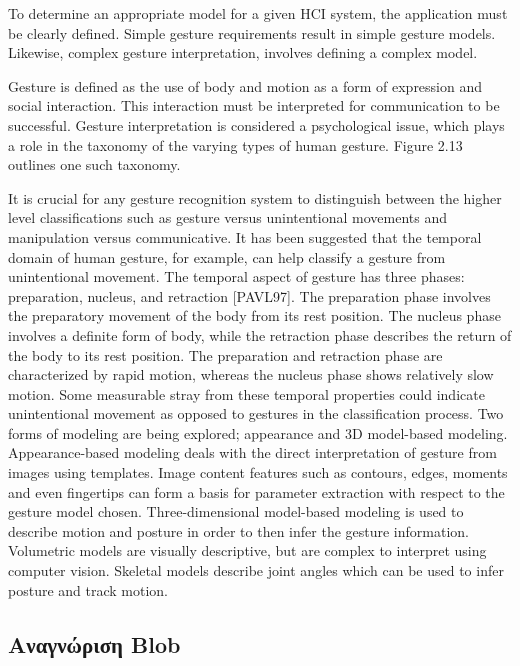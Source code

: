 To determine an appropriate model for a given HCI system, the application must be clearly defined. Simple gesture requirements result in simple gesture models. Likewise, complex gesture interpretation, involves defining a complex model.

Gesture is defined as the use of body and motion as a form of expression and social interaction. This interaction must be interpreted for communication to be successful. Gesture interpretation is considered a psychological issue, which plays a role in the taxonomy of the varying types of human gesture. Figure 2.13 outlines one such taxonomy.

It is crucial for any gesture recognition system to distinguish between the higher level classifications such as gesture versus unintentional movements and manipulation versus communicative. It has been suggested that the temporal domain of human gesture, for example, can help classify a gesture from unintentional movement. The temporal aspect of gesture has three phases: preparation, nucleus, and retraction [PAVL97]. The preparation phase involves the preparatory movement of the body from its rest position. The nucleus phase involves a definite form of body, while the retraction phase describes the return of the body to its rest position. The preparation and retraction phase are characterized by rapid motion, whereas the nucleus phase shows relatively slow motion. Some measurable stray from these temporal properties could indicate unintentional movement as opposed to gestures in the classification process. Two forms of modeling are being explored; appearance and 3D model-based modeling. Appearance-based modeling deals with the direct interpretation of gesture from images using templates. Image content features such as contours, edges, moments and even fingertips can form a basis for parameter extraction with respect to the gesture model chosen. Three-dimensional model-based modeling is used to describe motion and posture in order to then infer the gesture information. Volumetric models are visually descriptive, but are complex to interpret using computer vision. Skeletal models describe joint angles which can be used to infer posture and track motion.
\subsection{Αναγνώριση Blob}
